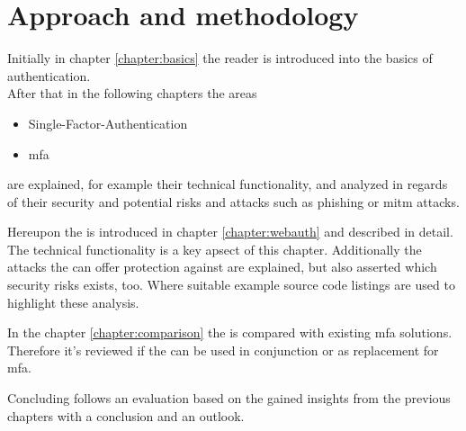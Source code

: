 \section{Approach and methodology}

Initially in chapter \ref{chapter:basics} the reader is introduced into the basics of authentication.\\
After that in the following chapters the areas

\begin{itemize}
	\item Single-Factor-Authentication
	\item \gls{mfa}
\end{itemize}

are explained, for example their technical functionality, and analyzed in regards of their security and potential risks and attacks such as phishing or \gls{mitm} attacks.

Hereupon the \wa{} is introduced in chapter \ref{chapter:webauth} and described in detail. The technical functionality is a key apsect of this chapter. Additionally the attacks the \wa{} can offer protection against are explained, but also asserted which security risks exists, too. Where suitable example source code listings are used to highlight these analysis.

In the chapter \ref{chapter:comparison} the \wa{} is compared with existing \gls{mfa} solutions. Therefore it's reviewed if the \wa{} can be used in conjunction or as replacement for \gls{mfa}.

Concluding follows an evaluation based on the gained insights from the previous chapters with a conclusion and an outlook.
